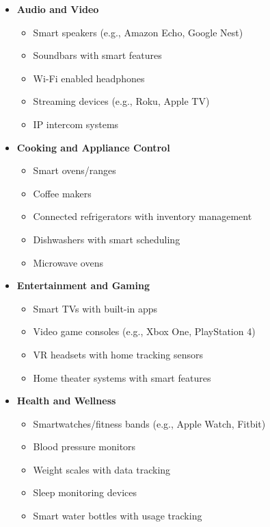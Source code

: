 \documentclass[10pt, journal]{IEEEtran} %
\begin{document}
\begin{itemize}[]
    \item{\textbf{Audio and Video}}
        \begin{itemize}
            \item Smart speakers (e.g., Amazon Echo, Google Nest)
            \item Soundbars with smart features
            \item Wi-Fi enabled headphones
            \item Streaming devices (e.g., Roku, Apple TV)
            \item IP intercom systems
        \end{itemize}

    \item{\textbf{Cooking and Appliance Control}}
        \begin{itemize}
            \item Smart ovens/ranges
            \item Coffee makers
            \item Connected refrigerators with inventory management
            \item Dishwashers with smart scheduling
            \item Microwave ovens
        \end{itemize}

    \item{\textbf{Entertainment and Gaming}}
        \begin{itemize}
            \item Smart TVs with built-in apps
            \item Video game consoles (e.g., Xbox One, PlayStation 4)
            \item VR headsets with home tracking sensors
            \item Home theater systems with smart features
        \end{itemize}

    \item{\textbf{Health and Wellness}}
        \begin{itemize}
            \item Smartwatches/fitness bands (e.g., Apple Watch, Fitbit)
            \item Blood pressure monitors
            \item Weight scales with data tracking
            \item Sleep monitoring devices
            \item Smart water bottles with usage tracking
        \end{itemize}


\end{itemize}
\end{document}
